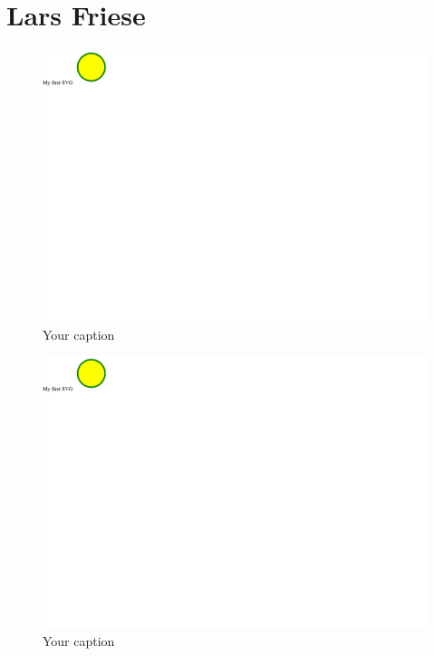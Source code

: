 \documentclass{article}
\begin{document}
\section{Lars Friese}
\begin{figure}[h!]
    \centering
    \captionsetup{labelformat=empty}
    \caption{Your caption}
    \includegraphics[width=\textwidth, angle=0]{Kreis2.pdf}
\end{figure}
\newpage
\begin{figure}[h!]
    \centering
    \captionsetup{labelformat=empty}
    \caption{Your caption}
    \includegraphics[width=\textwidth, angle=0]{Kreis2.pdf}
\end{figure}
\newpage
\end{document}
